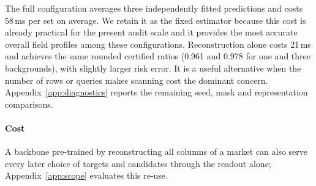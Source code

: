 The full configuration averages three independently fitted predictions and costs 58\,ms per set on average. We retain it as the fixed estimator because this cost is already practical for the present audit scale and it provides the most accurate overall field profiles among these configurations. Reconstruction alone costs 21\,ms and achieves the same rounded certified ratios (0.961 and 0.978 for one and three backgrounds), with slightly larger risk error. It is a useful alternative when the number of rows or queries makes scanning cost the dominant concern. Appendix~\ref{app:diagnostics} reports the remaining seed, mask and representation comparisons.



\paragraph{Cost}
 A backbone pre-trained by reconstructing all columns of a market can also serve every later choice of
targets and candidates through the readout alone; Appendix~\ref{app:scope} evaluates this re-use.
